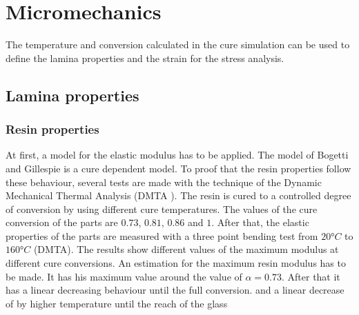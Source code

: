 \section{Micromechanics}
The temperature and conversion calculated in the cure simulation can be used to define the lamina properties and the strain for the stress analysis.
\subsection{Lamina properties}
\subsubsection{Resin properties}
At first, a model for the elastic modulus has to be applied. The model of Bogetti and Gillespie \cite{bogetti_process-induced_1992} is a cure dependent model. To proof that the resin properties follow these behaviour, several tests are made with the technique of the Dynamic Mechanical Thermal Analysis (DMTA \cite{wetton1986dynamic}). The resin is cured to a controlled degree of conversion by using different cure temperatures. The values of the cure conversion of the parts are $0.73$, $0.81$, $0.86$ and $1$. After that, the  elastic properties of the parts are measured with a three point bending test from $20°C$ to $160°C$ (DMTA). The results show different values of the maximum modulus at different cure conversions. An estimation for the maximum resin modulus has to be made. It has his maximum value around the value of $\alpha=0.73$. After that it has a linear decreasing behaviour until the full conversion.  and a linear decrease of by higher temperature until the reach of the glass 